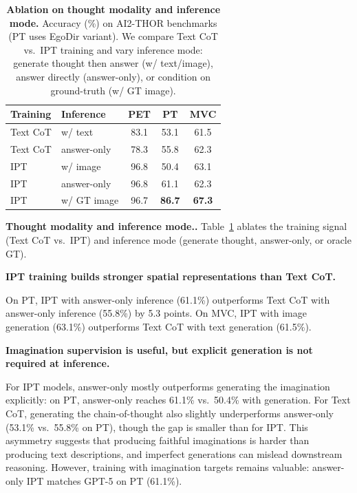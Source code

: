 \documentclass{llmxive}
\providecommand{\paragraph}[1]{\vspace{.5em}\noindent\textbf{#1.}}
\begin{document}
\begin{table}[t]
  \vspace{-1em}
  \centering
  \setlength{\tabcolsep}{6pt}
  \small
  \begin{tabular}{ll ccc}
    \toprule
    \textbf{Training} & \textbf{Inference} & \textbf{PET} & \textbf{PT} & \textbf{MVC} \\
    \midrule
    Text CoT   & w/ text      & 83.1 & 53.1 & 61.5 \\
    Text CoT   & answer-only  & 78.3 & 55.8 & 62.3 \\
    \midrule
    IPT        & w/ image     & 96.8 & 50.4 & 63.1 \\
    IPT        & answer-only  & 96.8 & 61.1 & 62.3 \\
    \midrule
    IPT        & w/ GT image  & 96.7 & \textbf{86.7} & \textbf{67.3} \\
    \bottomrule
  \end{tabular}
  \label{tab:ablation_thought}
\caption{\textbf{Ablation on thought modality and inference mode.} Accuracy (\%) on AI2-THOR benchmarks (PT uses EgoDir variant). We compare Text CoT vs.\ IPT training and vary inference mode: generate thought then answer (w/ text/image), answer directly (answer-only), or condition on ground-truth (w/ GT image).}
\end{table}
\vspace{-1em}
\paragraph{Thought modality and inference mode.}
Table~\ref{tab:ablation_thought} ablates the training signal (Text CoT vs.\ IPT) and inference mode (generate thought, answer-only, or oracle GT).

\begin{takeawayblock}
    \textbf{IPT training builds stronger spatial representations than Text CoT.}
\end{takeawayblock}
On PT, IPT with answer-only inference (61.1\%) outperforms Text CoT with answer-only inference (55.8\%) by 5.3 points.
On MVC, IPT with image generation (63.1\%) outperforms Text CoT with text generation (61.5\%).

\begin{takeawayblock}
    \textbf{Imagination supervision is useful, but explicit generation is not required at inference.}
\end{takeawayblock}
For IPT models, answer-only mostly outperforms generating the imagination explicitly: on PT, answer-only reaches 61.1\% vs.\ 50.4\% with generation.
For Text CoT, generating the chain-of-thought also slightly underperforms answer-only (53.1\% vs.\ 55.8\% on PT), though the gap is smaller than for IPT.
This asymmetry suggests that producing faithful imaginations is harder than producing text descriptions, and imperfect generations can mislead downstream reasoning. However, training with imagination targets remains valuable: answer-only IPT matches GPT-5 on PT (61.1\%).
\end{document}
